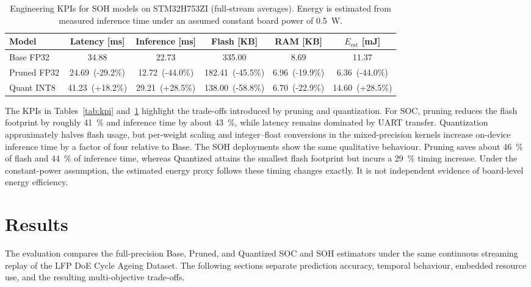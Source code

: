 \documentclass[review]{elsarticle}
\begin{document}
  \begin{table}[t!]
      \centering
      \caption{Engineering KPIs for SOH models on STM32H753ZI (full-stream averages). Energy is estimated from measured inference time under an assumed constant board power of \SI{0.5}{\watt}.}
      \label{tab:kpi_soh}
        \begin{tabular}{lccccc}
            \toprule
            Model & Latency [ms] & Inference [ms] & Flash [KB] & RAM [KB] & $E_{\mathrm{est}}$ [mJ] \\
            \midrule
            Base FP32 & 34.88 & 22.73 & 335.00 & 8.69 & 11.37 \\
            Pruned FP32 & 24.69~\textcolor{mgGreen}{(-29.2\%)} & 12.72~\textcolor{mgGreen}{(-44.0\%)} & 182.41~\textcolor{mgGreen}{(-45.5\%)} & 6.96~\textcolor{mgGreen}{(-19.9\%)} & 6.36~\textcolor{mgGreen}{(-44.0\%)} \\
            Quant INT8 & 41.23~\textcolor{mgRed}{(+18.2\%)} & 29.21~\textcolor{mgRed}{(+28.5\%)} & 138.00~\textcolor{mgGreen}{(-58.8\%)} & 6.70~\textcolor{mgGreen}{(-22.9\%)} & 14.60~\textcolor{mgRed}{(+28.5\%)} \\
            \bottomrule
        \end{tabular}
\end{table}

The KPIs in Tables~\ref{tab:kpi} and~\ref{tab:kpi_soh} highlight the trade-offs introduced by pruning and quantization. For SOC, pruning reduces the flash footprint by roughly 41~\% and inference time by about 43~\%, while latency remains dominated by UART transfer. Quantization approximately halves flash usage, but per-weight scaling and integer--float conversions in the mixed-precision kernels increase on-device inference time by a factor of four relative to Base. The SOH deployments show the same qualitative behaviour. Pruning saves about 46~\% of flash and 44~\% of inference time, whereas Quantized attains the smallest flash footprint but incurs a 29~\% timing increase. Under the constant-power assumption, the estimated energy proxy follows these timing changes exactly. It is not independent evidence of board-level energy efficiency.

\section{Results}
\label{sec:results}
The evaluation compares the full-precision Base, Pruned, and Quantized SOC and SOH estimators under the same continuous streaming replay of the LFP DoE Cycle Ageing Dataset. The following sections separate prediction accuracy, temporal behaviour, embedded resource use, and the resulting multi-objective trade-offs.
\end{document}
